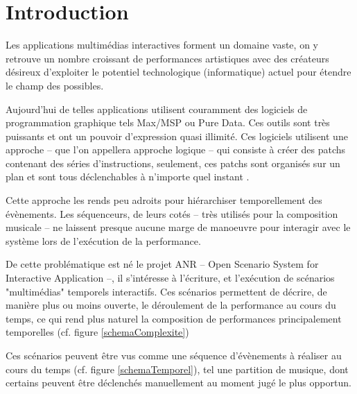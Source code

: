\chapter*{Introduction}

Les applications multimédias interactives forment un domaine vaste, on y retrouve un nombre croissant de performances artistiques avec des créateurs désireux d'exploiter le potentiel technologique (informatique) actuel pour étendre le champ des possibles.

Aujourd'hui de telles applications utilisent couramment des logiciels de programmation graphique tels Max/MSP ou Pure Data. Ces outils sont très puissants et ont un pouvoir d'expression quasi illimité.
Ces logiciels utilisent une approche -- que l'on appellera approche logique -- qui consiste à créer des patchs contenant des séries d'instructions, seulement, ces patchs sont organisés sur un plan et sont tous déclenchables à n'importe quel instant .


Cette approche les rends peu adroits pour hiérarchiser temporellement des évènements. Les séquenceurs, de leurs cotés -- très utilisés pour la composition musicale -- ne laissent presque aucune marge de manoeuvre pour interagir avec le système lors de l'exécution de la performance.

De cette problématique est né le projet ANR \ossia{} -- Open Scenario System for Interactive Application --, il s'intéresse à l'écriture, et l'exécution de scénarios "multimédias" temporels interactifs. Ces scénarios permettent de décrire, de manière plus ou moins ouverte, le déroulement de la performance au cours du temps, ce qui rend plus naturel la composition de performances principalement temporelles (cf. figure \ref{schemaComplexite})


Ces scénarios peuvent être vus comme une séquence d'évènements à réaliser au cours du temps (cf. figure \ref{schemaTemporel}), tel une partition de musique, dont certains peuvent être déclenchés manuellement au moment jugé le plus opportun.


